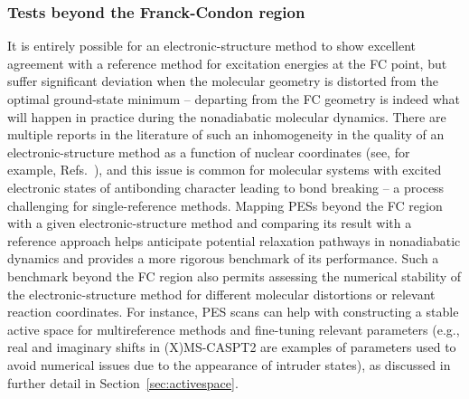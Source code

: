 \documentclass[9pt,bestpractices,pubversion]{livecoms}
\begin{document}
\subsubsection{Tests beyond the Franck-Condon region}\label{sec:beyondfstest}
It is entirely possible for an electronic-structure method to show excellent agreement with a reference method for excitation energies at the FC point, but suffer significant deviation when the molecular geometry is distorted from the optimal ground-state minimum -- departing from the FC geometry is indeed what will happen in practice during the nonadiabatic molecular dynamics. There are multiple reports in the literature of such an inhomogeneity in the quality of an electronic-structure method as a function of nuclear coordinates (see, for example, Refs.~), and this issue is common for molecular systems with excited electronic states of antibonding character leading to bond breaking -- a process challenging for single-reference methods. Mapping PESs beyond the FC region with a given electronic-structure method and comparing its result with a reference approach helps anticipate potential relaxation pathways in nonadiabatic dynamics and provides a more rigorous benchmark of its performance. Such a benchmark beyond the FC region also permits assessing the numerical stability of the electronic-structure method for different molecular distortions or relevant reaction coordinates. For instance, PES scans can help with constructing a stable active space for multireference methods and fine-tuning relevant parameters (e.g., real and imaginary shifts in (X)MS-CASPT2 are examples of parameters used to avoid numerical issues due to the appearance of intruder states), as discussed in further detail in Section~\ref{sec:activespace}.
 
\end{document}
